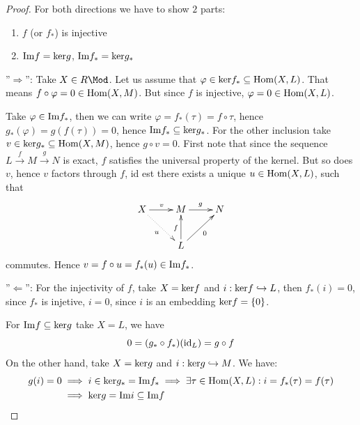 \documentclass[twoside = false,	%
		headsepline,		%
		parskip = true,
		]{scrbook}						%
\begin{document}
        \begin{proof}
            For both directions we have to show $2$ parts:
        \begin{enumerate}
            \item $f$ (or $f_*$) is injective
            \item $\mathrm{Im} f =\mathrm{ker} g$, $\mathrm{Im} f_* = \mathrm{ker} g_*$
        \end{enumerate}
        ''$\Rightarrow$'': Take $X \in R\Mod$.
        Let us assume that $\varphi \in \mathrm{ker} f_* \subseteq \mathrm{Hom}(X,L)$.
        That means $f \circ \varphi = 0 \in \mathrm{Hom}(X,M)$. But since $f$ is injective, $\varphi = 0 \in \mathrm{Hom}(X,L)$.

        Take $\varphi \in \mathrm{Im} f_*$, then we can write $\varphi = f_* (\tau) = f \circ \tau$, hence
        $g_*(\varphi) = g(f(\tau)) = 0$, hence $\mathrm{Im} f_* \subseteq \mathrm{ker} g_*$.
        For the other inclusion take $v \in \mathrm{ker} g_* \subseteq \mathrm{Hom}(X,M)$, hence $g \circ v = 0$.
        First note that since the sequence $L \xrightarrow{f} M \xrightarrow{g} N$ is exact, $f$ satisfies the
        universal property of the kernel. But so does $v$, hence $v$ factors through $f$, id est there exists a unique $u \in \mathrm{Hom}(X,L)$, such that
        \begin{equation*}
            \xymatrix {
                X \ar[r]^{v} \ar@{.>}[dr]_{u} & M\ar[r]^{g} & N \\
                 & L \ar[u]^{f} \ar[ur]_{0}
            }
        \end{equation*}
        commutes. Hence $v = f \circ u = f_*(u) \in \mathrm{Im} f_*$.

        ''$\Leftarrow$'':
        For the injectivity of $f$, take $X = \mathrm{ker} f$ and $i: \mathrm{ker} f \hookrightarrow L$, then
        $f_*(i) = 0$, since $f_*$ is injetive, $i=0$, since $i$ is an embedding $\mathrm{ker} f = \{0\}$.

        For $\mathrm{Im} f \subseteq \mathrm{ker} g$ take $X = L$, we have
        \begin{equation*}
            0 = (g_* \circ f_*)(\mathrm{id}_L) = g \circ f
        \end{equation*}
        On the other hand, take $X = \mathrm{ker} g$ and $i: \mathrm{ker} g \hookrightarrow M$. We have:
        \begin{equation*}
            \begin{split}
                g(i) = 0 &\implies i \in \mathrm{ker} g_* = \mathrm{Im} f_* \implies \exists \tau \in \mathrm{Hom}(X,L): i = f_*(\tau) = f(\tau) \\
                        &\implies \mathrm{ker} g = \mathrm{Im} i \subseteq \mathrm{Im} f
            \end{split}
        \end{equation*}
        \end{proof}
        
\end{document}

